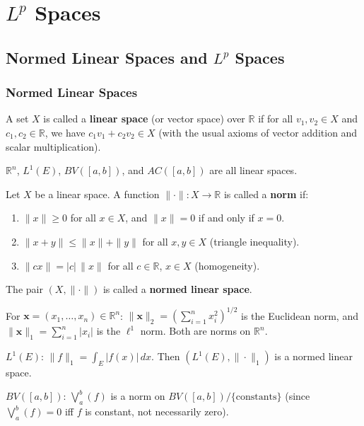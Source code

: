 \documentclass[11pt]{report}
\begin{document}
\chapter{$L^p$ Spaces}

\section{Normed Linear Spaces and $L^p$ Spaces}

\subsection{Normed Linear Spaces}

\begin{defbox}
A set $X$ is called a \textbf{linear space} (or vector space) over $\mathbb{R}$ if for all $v_1, v_2 \in X$ and $c_1, c_2 \in \mathbb{R}$, we have $c_1 v_1 + c_2 v_2 \in X$ (with the usual axioms of vector addition and scalar multiplication).
\end{defbox}

\begin{exbox}
$\mathbb{R}^n$, $L^1(E)$, $BV([a,b])$, and $AC([a,b])$ are all linear spaces.
\end{exbox}

\begin{defbox}[Norm]
Let $X$ be a linear space. A function $\|\cdot\|: X \to \mathbb{R}$ is called a \textbf{norm} if:
\begin{enumerate}[label=(\roman*)]
\item $\|x\| \geq 0$ for all $x \in X$, and $\|x\| = 0$ if and only if $x = 0$.
\item $\|x + y\| \leq \|x\| + \|y\|$ for all $x, y \in X$ (triangle inequality).
\item $\|cx\| = |c|\,\|x\|$ for all $c \in \mathbb{R}$, $x \in X$ (homogeneity).
\end{enumerate}
The pair $(X, \|\cdot\|)$ is called a \textbf{normed linear space}.
\end{defbox}

\begin{exbox}
For $\mathbf{x} = (x_1, \ldots, x_n) \in \mathbb{R}^n$: $\|\mathbf{x}\|_2 = \left(\sum_{i=1}^{n} x_i^2\right)^{1/2}$ is the Euclidean norm, and $\|\mathbf{x}\|_1 = \sum_{i=1}^{n} |x_i|$ is the $\ell^1$ norm. Both are norms on $\mathbb{R}^n$.
\end{exbox}

\begin{exbox}
$L^1(E)$: $\|f\|_1 = \int_E |f(x)|\,dx$. Then $(L^1(E), \|\cdot\|_1)$ is a normed linear space.

$BV([a,b])$: $\bigvee_a^b(f)$ is a norm on $BV([a,b]) / \{\text{constants}\}$ (since $\bigvee_a^b(f) = 0$ iff $f$ is constant, not necessarily zero).
\end{exbox}
\end{document}
